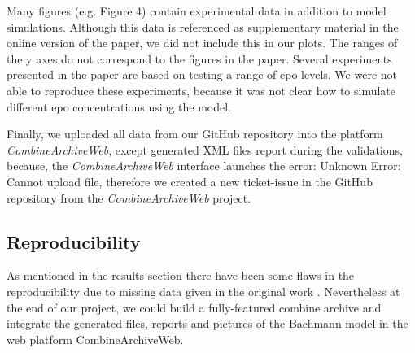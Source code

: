 Many figures (e.g. Figure 4) contain experimental data in addition to model simulations. Although this data is referenced as supplementary material in the online version of the paper, we did not include this in our plots. The ranges of the y axes do not correspond to the figures in the paper. 
Several experiments presented in the paper are based on testing a range of \ac{epo} levels. We were not able to reproduce these experiments, because it was not clear how to simulate different \ac{epo} concentrations using the model.

Finally, we uploaded all data from our GitHub repository into the platform \textit{CombineArchiveWeb}, except generated XML files report during the validations, because, the \textit{CombineArchiveWeb} interface launches the error: \textsf{Unknown Error: Cannot upload file}, therefore we created a new ticket-issue in the GitHub repository from the \textit{CombineArchiveWeb} project.

\subsection*{Reproducibility}
As mentioned in the results section there have been some flaws in the reproducibility due to missing data given in the original work \cite{bachmannmodel}. Nevertheless at the end of our project, we could build a fully-featured \ac{combine} archive and integrate the generated files, reports and pictures of the Bachmann model in the web platform CombineArchiveWeb.